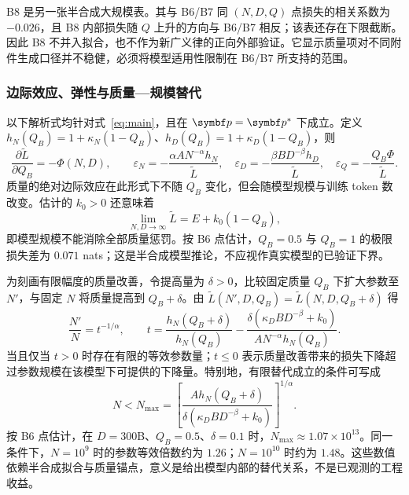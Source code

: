 B8 是另一张半合成大规模表。其与 B6/B7 同 $(N,D,Q)$ 点损失的相关系数为 $-0.026$，且 B8 内部损失随 $Q$ 上升的方向与 B6/B7 相反；该表还存在下限截断。因此 B8 不并入拟合，也不作为新广义律的正向外部验证。它显示质量项对不同附件生成口径并不稳健，必须将模型适用性限制在 B6/B7 所支持的范围。

\subsubsection{边际效应、弹性与质量—规模替代}

以下解析式均针对式~\eqref{eq:main}，且在 $\bp=\bp^*$ 下成立。定义 $h_N(Q_B)=1+\kappa_N(1-Q_B)$、$h_D(Q_B)=1+\kappa_D(1-Q_B)$，则
\begin{equation}
\frac{\partial\widetilde L}{\partial Q_B}=-\Phi(N,D),\qquad
\varepsilon_N=-\frac{\alpha AN^{-\alpha}h_N}{\widetilde L},\quad
\varepsilon_D=-\frac{\beta BD^{-\beta}h_D}{\widetilde L},\quad
\varepsilon_Q=-\frac{Q_B\Phi}{\widetilde L}.
\label{eq:q2_elasticities}
\end{equation}
质量的绝对边际效应在此形式下不随 $Q_B$ 变化，但会随模型规模与训练 token 数改变。估计的 $k_0>0$ 还意味着
\begin{equation}
\lim_{N,D\to\infty}\widetilde L=E+k_0(1-Q_B),
\label{eq:q2_floor}
\end{equation}
即模型规模不能消除全部质量惩罚。按 B6 点估计，$Q_B=0.5$ 与 $Q_B=1$ 的极限损失差为 $0.071$ nats；这是半合成模型推论，不应视作真实模型的已验证下界。

为刻画有限幅度的质量改善，令提高量为 $\delta>0$，比较固定质量 $Q_B$ 下扩大参数至 $N'$，与固定 $N$ 将质量提高到 $Q_B+\delta$。由 $\widetilde L(N',D,Q_B)=\widetilde L(N,D,Q_B+\delta)$ 得
\begin{equation}
\frac{N'}{N}=t^{-1/\alpha},\qquad
 t=\frac{h_N(Q_B+\delta)}{h_N(Q_B)}-
 \frac{\delta\left(\kappa_DBD^{-\beta}+k_0\right)}{AN^{-\alpha}h_N(Q_B)}.
\label{eq:sub}
\end{equation}
当且仅当 $t>0$ 时存在有限的等效参数量；$t\leq0$ 表示质量改善带来的损失下降超过参数规模在该模型下可提供的下降量。特别地，有限替代成立的条件可写成
\begin{equation}
N<N_{\max}=\left[\frac{A h_N(Q_B+\delta)}{\delta(\kappa_DBD^{-\beta}+k_0)}\right]^{1/\alpha}.
\label{eq:q2_nmax}
\end{equation}
按 B6 点估计，在 $D=300$B、$Q_B=0.5$、$\delta=0.1$ 时，$N_{\max}\approx1.07\times10^{13}$。同一条件下，$N=10^9$ 时的参数等效倍数约为 $1.26$；$N=10^{10}$ 时约为 $1.48$。这些数值依赖半合成拟合与质量锚点，意义是给出模型内部的替代关系，不是已观测的工程收益。

